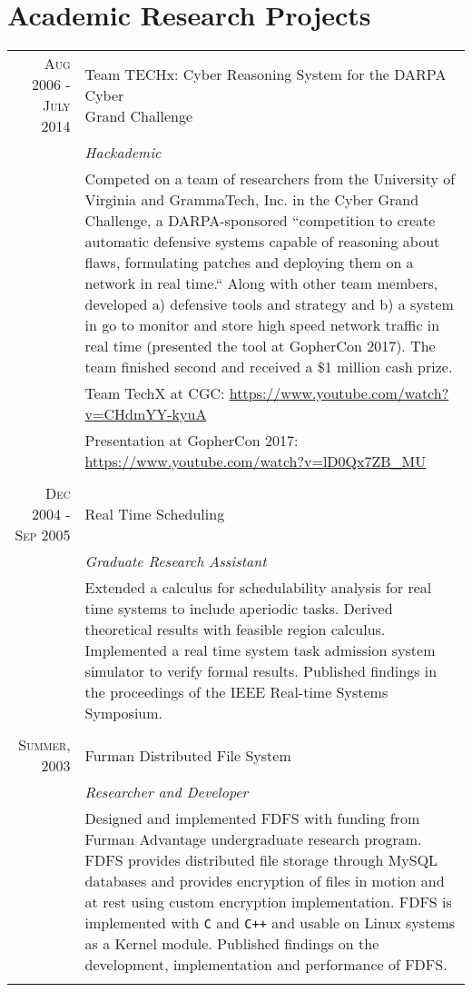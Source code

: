 \documentclass[a4paper,10pt]{article} %
\begin{document}
\section{Academic Research Projects}
\begin{tabular}{r|p{11cm}}

\textsc{Aug 2006 - July 2014} & \makecell[tl]{Team TECHx: Cyber Reasoning System for the DARPA Cyber \\ Grand Challenge} \\
& \emph{Hackademic} \\
& \footnotesize{Competed on a team of researchers from the University of Virginia and GrammaTech, Inc. in the Cyber Grand Challenge, a DARPA-sponsored ``competition to create automatic defensive systems capable of reasoning about flaws, formulating patches and deploying them on a network in real time.`` Along with other team members, developed a) defensive tools and strategy and b) a system in go to monitor and store high speed network traffic in real time (presented the tool at GopherCon 2017). The team finished second and received a \$1 million cash prize.} \\
& Team TechX at CGC: \url{https://www.youtube.com/watch?v=CHdmYY-kyuA} \\
& Presentation at GopherCon 2017: \url{https://www.youtube.com/watch?v=lD0Qx7ZB_MU} \\
\multicolumn{2}{c}{} \\

\textsc{Dec 2004 - Sep 2005} & Real Time Scheduling \\
& \emph{Graduate Research Assistant} \\
& \footnotesize{Extended a calculus for schedulability analysis for real time systems to include aperiodic tasks. Derived theoretical results with feasible region calculus. Implemented a real time system task admission system simulator to verify formal results. Published findings in the proceedings of the IEEE Real-time Systems Symposium.} \\
\multicolumn{2}{c}{} \\

\textsc{Summer, 2003} & Furman Distributed File System \\
& \emph{Researcher and Developer} \\
& \footnotesize{Designed and implemented FDFS with funding from Furman Advantage undergraduate research program. FDFS provides distributed file storage through MySQL databases and provides encryption of files in motion and at rest using custom encryption implementation. FDFS is implemented with \texttt{C} and \texttt{C++} and usable on Linux systems as a Kernel module. Published findings on the development, implementation and performance of FDFS.} \\
\multicolumn{2}{c}{} \\


\end{tabular}
\end{document}
